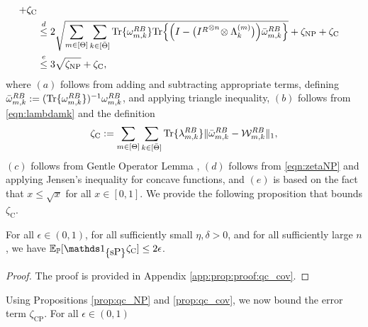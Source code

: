 \begin{align*}
+ \zeta_{\text{C}}\\
    &\overset{d}{\leq}
    2 \sqrt{\sum_{m \in [\Theta]}\sum_{\substack{k\in [\bar{\Theta}]}}  \text{Tr}\{\omega^{R B}_{m,k}\} \text{Tr}\Big\{\Big( I-\big({I^{R}}^{\otimes n} \!\otimes \Lambda_{k}^{(m)}\big)\Big)\bar{\omega}^{R B}_{m,k}\Big\}} + \zeta_{\text{NP}} + \zeta_{\text{C}}\\
    &\overset{e}{\leq} 3\sqrt{\zeta_{\text{NP}}}+ \zeta_{\text{C}},
\end{align*}
where $(a)$ follows from adding and subtracting appropriate terms, defining $\bar{\omega}^{R B}_{m,k}:= (\text{Tr}\{\omega^{R B}_{m,k}\})^{-1} \omega^{R B}_{m,k}$, and applying triangle inequality, $(b)$ follows from \eqref{eqn:lambdamk} and the definition $$\zeta_{\text{C}}:= \sum_{m \in [\Theta]}\sum_{\substack{k\in [\bar{\Theta}]}}\text{Tr}\{\lambda_{m,k}^{R B}\}\|\bar{\omega}_{m,k}^{R B} -  \mathcal{W}_{m,k}^{R B}\|_1,$$ $(c)$ follows from Gentle Operator Lemma \cite[Lemma 9.4.2]{wilde_arxivBook}, $(d)$ follows from \eqref{eqn:zetaNP} and applying Jensen's inequality for concave functions, and $(e)$ is based on the fact that $x \leq \sqrt{x}$ for all $x\in [0,1]$.
We provide the following proposition that bounds $\zeta_{\text{C}}$.
\begin{prop}\label{prop:qc_cov}
    For all $\epsilon\in(0,1)$, for all sufficiently small $\eta, \delta>0$, and for all sufficiently large $n$, we have $\EE_\PP[\I_{\curly{\mbox{\normalfont sP}}}\zeta_{\text{C}}]\leq 2\epsilon$.
\end{prop} 
\begin{proof}
The proof is provided in Appendix \ref{app:prop:proof:qc_cov}.
\end{proof}
Using Propositions \ref{prop:qc_NP} and \ref{prop:qc_cov}, we now bound the error term $\zeta_{\text{CP}}$. For all $\epsilon\in (0,1)$
